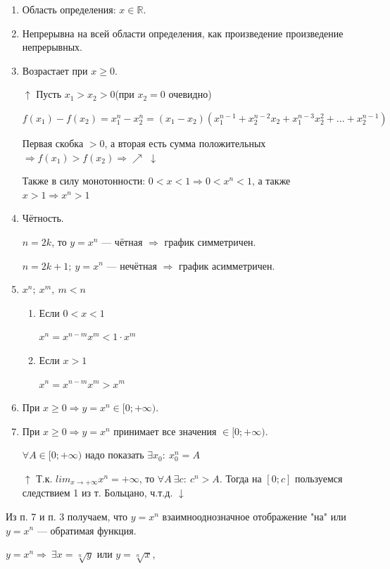 \documentclass{article}
\begin{document}
    \begin{enumerate}
        \item Область определения: \( x \in \mathbb{R}\).
        \item Непрерывна на всей области определения, как произведение произведение непрерывных.
        \item Возрастает при \(x \geq 0\).
        
        \(\uparrow\) Пусть \(x_1 > x_2 > 0\)(при \(x_2=0\) очевидно)

        \( f(x_1) - f(x_2) = x_1^n - x_2^n = (x_1 - x_2)(x_1^{n - 1} + x_2^{n - 2}x_2 + x_1^{n - 3}x_2^2 + ... + x_2^{n - 1}) \) 

        Первая скобка \( > 0 \), а вторая есть сумма положительных \( \Rightarrow f(x_1) > f(x_2) \Rightarrow \nearrow\) \(\downarrow\)
        
        Также в силу монотонности: \( 0 < x < 1 \Rightarrow 0 < x^n < 1 \), а также \(x > 1 \Rightarrow x^n > 1\)

        \item Чётность.
        
        \( n = 2k \), то \( y = x^n \) --- чётная \( \Rightarrow \) график симметричен.
        
        \(n = 2k + 1;\ y = x^n\) --- нечётная \(\Rightarrow\) график асимметричен.
        
        \item \(x^n;\ x^m,\ m < n\)

        \begin{enumerate}
            \item Если \(0 < x < 1\)

            \(x^n = x^{n-m}x^m < 1 \cdot x^m\)

            \item Если \(x > 1\)

            \(x^n = x^{n-m}x^m > x^m\)
        \end{enumerate}
    
        \item При \( x \geq 0 \Rightarrow y = x^n \in [0; +\infty) \).
        \item При \( x \geq 0 \Rightarrow y = x^n \) принимает все значения \( \in [0; +\infty) \).

        \(\forall A \in [0; +\infty)\) надо показать \(\exists x_0:\ x_0^n = A\)

        \(\uparrow\) Т.к. \(lim_{x \rightarrow +\infty} x^n = +\infty\), то \(\forall A\ \exists c:\ c^n > A\). Тогда на \([0; c]\) пользуемся следствием 1 из т. Больцано, ч.т.д. \(\downarrow\)
        
    \end{enumerate}

    Из п. 7 и п. 3 получаем, что \( y = x^n \) взаимнооднозначное отображение "на" или \( y = x^n \) --- обратимая функция.

    \( y = x^n \Rightarrow\ \exists x = \sqrt[n]{y} \) или \( y = \sqrt[n]{x} \),
    
\end{document}
